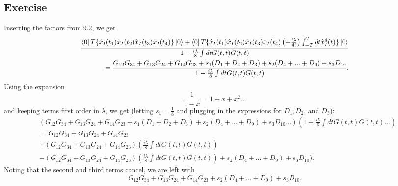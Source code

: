 \subsection{Exercise}
Inserting the factors from 9.2, we get 
\begin{align}
    \frac{\bra{0} T\{\hat x_I(t_1)\hat x_I(t_2)\hat x_I(t_3)\hat x_I(t_4)\}\ket{0}+\bra{0} T\{\hat x_I(t_1)\hat x_I(t_2)\hat x_I(t_3)\hat x_I(t_4)\left(-\frac{i\lambda}{4!}\right)\int_{-T}^T dt \hat x_I^4(t)\}\ket{0}}{1-\frac{i\lambda} 8 \int dt G(t,t)G(t,t)}\\
    =\frac{G_{12}G_{34}+G_{13}G_{24}+G_{14}G_{23}+s_1(D_1+D_2+D_3)+s_2(D_4+...+D_9)+s_3D_{10}}{1-\frac{i\lambda} 8 \int dt G(t,t)G(t,t)}.
\end{align}
Using the expansion
\begin{equation}
    \frac 1 {1-x}=1+x+x^2...
\end{equation}
and keeping terms first order in $\lambda$, we get (letting $s_1=\frac 1 8$ and plugging in the expressions for $D_1,D_2$, and $D_3$):
\begin{align}
    &(G_{12}G_{34}+G_{13}G_{24}+G_{14}G_{23}+s_1(D_1+D_2+D_3)+s_2(D_4+...+D_9)+s_3D_{10}...)(1+\frac{i\lambda} 8 \int dt G(t,t)G(t,t)...)\\&=G_{12}G_{34}+G_{13}G_{24}+G_{14}G_{23}\\&+(G_{12}G_{34}+G_{13}G_{24}+G_{14}G_{23})(\frac{i\lambda} 8 \int dt G(t,t)G(t,t))\\&-(G_{12}G_{34}+G_{13}G_{24}+G_{14}G_{23})(\frac{i\lambda} 8 \int dt G(t,t)G(t,t))+s_2(D_4+...+D_9)+s_3D_{10}).
\end{align}
Noting that the second and third terms cancel, we are left with
\begin{equation}
    G_{12}G_{34}+G_{13}G_{24}+G_{14}G_{23}+s_2(D_4+...+D_9)+s_3D_{10}.
\end{equation}


